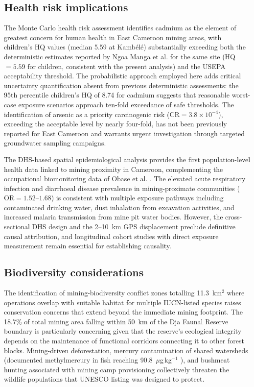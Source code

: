 \documentclass[preprint,12pt,authoryear]{elsarticle}
\begin{document}
\subsection{Health risk implications}

The Monte Carlo health risk assessment identifies cadmium as the element of greatest concern for human health in East Cameroon mining areas, with children's HQ values (median 5.59 at Kamb\'{e}l\'{e}) substantially exceeding both the deterministic estimates reported by Ngoa Manga et al. \citep{NgoaManga2024} for the same site (HQ $= 5.59$ for children, consistent with the present analysis) and the USEPA acceptability threshold. The probabilistic approach employed here adds critical uncertainty quantification absent from previous deterministic assessments: the 95th percentile children's HQ of 8.74 for cadmium suggests that reasonable worst-case exposure scenarios approach ten-fold exceedance of safe thresholds. The identification of arsenic as a priority carcinogenic risk ($\text{CR} = 3.8 \times 10^{-4}$), exceeding the acceptable level by nearly four-fold, has not been previously reported for East Cameroon and warrants urgent investigation through targeted groundwater sampling campaigns.

The DHS-based spatial epidemiological analysis provides the first population-level health data linked to mining proximity in Cameroon, complementing the occupational biomonitoring data of Obase et al. \citep{Obase2023}. The elevated acute respiratory infection and diarrhoeal disease prevalence in mining-proximate communities ($\text{OR} = 1.52$--$1.68$) is consistent with multiple exposure pathways including contaminated drinking water, dust inhalation from excavation activities, and increased malaria transmission from mine pit water bodies. However, the cross-sectional DHS design and the 2--10~km GPS displacement preclude definitive causal attribution, and longitudinal cohort studies with direct exposure measurement remain essential for establishing causality.

\subsection{Biodiversity considerations}

The identification of mining-biodiversity conflict zones totalling 11.3~km$^{2}$ where operations overlap with suitable habitat for multiple IUCN-listed species raises conservation concerns that extend beyond the immediate mining footprint. The 18.7\% of total mining area falling within 50~km of the Dja Faunal Reserve boundary is particularly concerning given that the reserve's ecological integrity depends on the maintenance of functional corridors connecting it to other forest blocks. Mining-driven deforestation, mercury contamination of shared watersheds (documented methylmercury in fish reaching 90.8~$\mu$g\,kg$^{-1}$ \citep{Mahmoudou2024}), and bushmeat hunting associated with mining camp provisioning \citep{Laurance2006} collectively threaten the wildlife populations that UNESCO listing was designed to protect.
\end{document}
